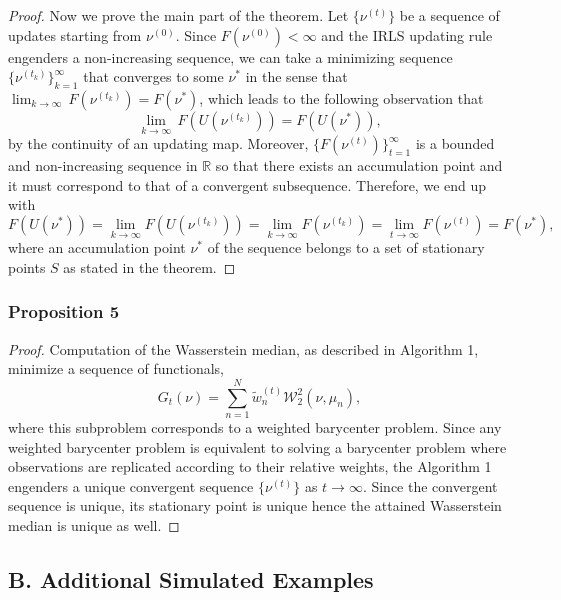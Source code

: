 \documentclass[11pt]{article}
\newcommand{\calW}{\mathcal{W}}
\newcommand{\bbR}{\mathbb{R}}
\begin{document}
\begin{proof}
	Now we prove the main part of the theorem. Let $\lbrace \nu^{(t)}\rbrace$ be a sequence of updates starting from $\nu^{(0)}$. Since $F(\nu^{(0)}) < \infty$  and the IRLS updating rule engenders a non-increasing sequence, we can take a minimizing sequence $\lbrace \nu^{(t_k)}\rbrace_{k=1}^\infty$ that converges to some $\nu^*$ in the sense that $\lim_{k\rightarrow \infty}\,F(\nu^{(t_k)}) = F(\nu^*)$, which leads to the following observation that
	\begin{equation*}
	\lim_{k\rightarrow \infty}\,F(U(\nu^{(t_k)})) = F(U(\nu^*)),
	\end{equation*}
	by the continuity of an updating map. Moreover, $\lbrace F(\nu^{(t)})\rbrace_{t=1}^{\infty}$ is a bounded and non-increasing sequence in $\bbR$ so that there exists an accumulation point and it must correspond to that of a convergent subsequence. Therefore, we end up with 
	\begin{equation*}
	F(U(\nu^*)) = \lim_{k\rightarrow \infty} F(U(\nu^{(t_k)})) 	= \lim_{k\rightarrow \infty} F(\nu^{(t_k)}) = \lim_{t\rightarrow\infty} F(\nu^{(t)}) = F(\nu^*),
	\end{equation*}
	where an accumulation point $\nu^*$ of the sequence belongs to a set of stationary points $S$ as stated in the theorem.
\end{proof}

\subsubsection*{Proposition 5}
\begin{proof}
Computation of the Wasserstein median, as described in Algorithm 1, minimize a sequence of functionals, 
\begin{equation*}
	G_t (\nu) = \sum_{n=1}^N \tilde{w}_n^{(t)} \calW_2^2(\nu,\mu_n),
\end{equation*}
where this subproblem corresponds to a weighted barycenter problem. Since any weighted barycenter problem is equivalent to solving a barycenter problem where observations are replicated according to their relative weights, the Algorithm 1 engenders a unique convergent sequence $\lbrace \nu^{(t)} \rbrace $ as $t \rightarrow \infty$. Since the convergent sequence is unique, its stationary point is unique hence the attained Wasserstein median is unique as well. 
\end{proof}

\subsection*{B. Additional Simulated Examples}
\end{document}
